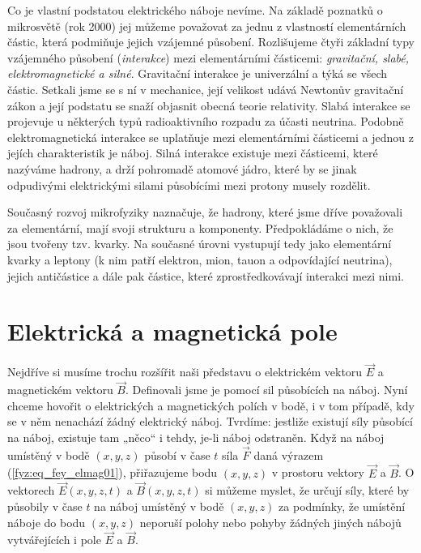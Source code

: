     \begin{mdframed}[style=mdexam]
      Co je vlastní podstatou elektrického náboje nevíme. Na základě poznatků o mikrosvětě
      (rok 2000) jej můžeme považovat za jednu z vlastností elementárních částic, která podmiňuje
      jejich vzájemné působení. Rozlišujeme čtyři základní typy vzájemného působení
      (\emph{interakce}) mezi elementárními částicemi: \emph{gravitační, slabé, elektromagnetické a
      silné}. Gravitační interakce je univerzální a týká se všech částic. Setkali jsme se s ní v
      mechanice, její velikost udává Newtonův gravitační zákon a její podstatu se snaží objasnit
      obecná teorie relativity. Slabá interakce se projevuje u některých typů radioaktivního rozpadu
      za účasti neutrina. Podobně elektromagnetická interakce se uplatňuje mezi elementárními
      částicemi a jednou z jejích charakteristik je náboj. Silná interakce existuje mezi částicemi,
      které nazýváme hadrony, a drží pohromadě atomové jádro, které by se jinak odpudivými
      elektrickými silami působícími mezi protony musely rozdělit.
      
      Současný rozvoj mikrofyziky naznačuje, že hadrony, které jsme dříve považovali za elementární,
      mají svoji strukturu a komponenty. Předpokládáme o nich, že jsou tvořeny tzv. kvarky. Na
      současné úrovni vystupují tedy jako elementární kvarky a leptony (k nim patří elektron, mion,
      tauon a odpovídající neutrina), jejich antičástice a dále pak částice, které zprostředkovávají
      interakci mezi nimi.
    \end{mdframed}
    
    \section{Elektrická a magnetická pole}
      Nejdříve si musíme trochu rozšířit naši představu o elektrickém vektoru \(\vec{E}\) a 
      magnetickém vektoru \(\vec{B}\). Definovali jsme je pomocí sil působících na náboj. Nyní 
      chceme hovořit o elektrických a magnetických polích v bodě, i v tom případě, kdy se v něm 
      nenachází žádný elektrický náboj. Tvrdíme: jestliže existují síly působící na náboj, existuje 
      tam „něco“ i tehdy, je-li náboj odstraněn. Když na náboj umístěný v bodě \((x, y, z)\) působí 
      v čase \(t\) síla \(\vec{F}\) daná výrazem (\ref{fyz:eq_fey_elmag01}), přiřazujeme bodu \((x, 
      y, z)\) v prostoru vektory \(\vec{E}\) a \(\vec{B}\). O vektorech \(\vec{E}(x,y, z, t)\) a 
      \(\vec{B}(x, y, z, t)\) si můžeme myslet, že určují síly, které by působily v čase \(t\) na 
      náboj umístěný v bodě \((x, y, z)\) za podmínky, že umístění náboje do bodu \((x, y, z)\) 
      neporuší polohy nebo pohyby žádných jiných nábojů vytvářejících i pole \(\vec{E}\) a 
      \(\vec{B}\).
    
